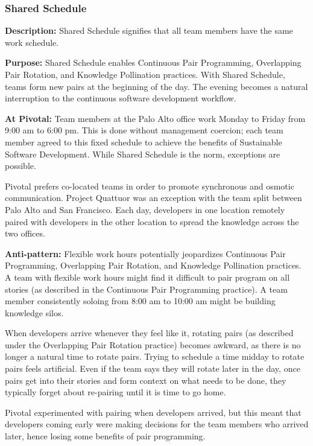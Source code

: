 \subsubsection{Shared Schedule}
\textbf{Description:} Shared Schedule signifies that all team members have the same work schedule. 

\textbf{Purpose:} Shared Schedule enables Continuous Pair Programming, Overlapping Pair Rotation, and Knowledge Pollination practices. With Shared Schedule, teams form new pairs at the beginning of the day. The evening becomes a natural interruption to the continuous software development workflow. 

\textbf{At Pivotal:} Team members at the Palo Alto office work Monday to Friday from 9:00 am to 6:00 pm. This is done without management coercion; each team member agreed to this fixed schedule to achieve the benefits of Sustainable Software Development. While Shared Schedule is the norm, exceptions are possible. 

Pivotal prefers co-located teams in order to promote synchronous and osmotic communication. Project Quattuor was an exception with the team split between Palo Alto and San Francisco. Each day, developers in one location remotely paired with developers in the other location to spread the knowledge across the two offices.

\textbf{Anti-pattern:} Flexible work hours potentially jeopardizes Continuous Pair Programming, Overlapping Pair Rotation, and Knowledge Pollination practices. A team with flexible work hours might find it difficult to pair program on all stories (as described in the Continuous Pair Programming practice). A team member consistently soloing from 8:00 am to 10:00 am might be building knowledge silos. 

When developers arrive whenever they feel like it, rotating pairs (as described under the Overlapping Pair Rotation practice) becomes awkward, as there is no longer a natural time to rotate pairs. Trying to schedule a time midday to rotate pairs feels artificial. Even if the team says they will rotate later in the day, once pairs get into their stories and form context on what needs to be done, they typically forget about re-pairing until it is time to go home.

Pivotal experimented with pairing when developers arrived, but this meant that developers coming early were making decisions for the team members who arrived later, hence losing some benefits of pair programming. 

